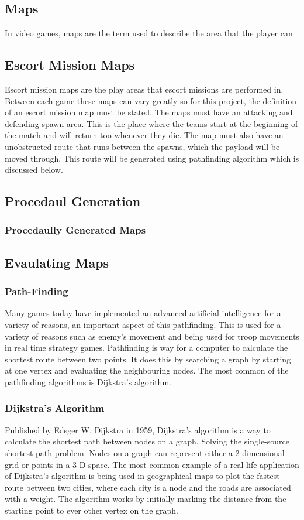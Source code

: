 \documentclass{article}
\begin{document}
\subsection{Maps}
In video games, maps are the term used to describe the area that the player can 
\subsection{Escort Mission Maps}
Escort mission maps are the play areas that escort missions are performed in. Between each game these maps can vary greatly so for this project, the definition of an escort mission map must be stated. The maps must have an attacking and defending spawn area. This is the place where the teams start at the beginning of the match and will return too whenever they die. The map must also have an unobstructed route that runs between the spawns, which the payload will be moved through. This route will be generated using pathfinding algorithm which is discussed below. 
\subsection{Procedaul Generation}
\subsubsection{Procedaully Generated Maps}
\subsection{Evaulating Maps}
\subsubsection{Path-Finding}
Many games today have implemented an advanced artificial intelligence for a variety of reasons, an important aspect of this pathfinding. This is used for a variety of reasons such as enemy’s movement and being used for troop movements in real time strategy games. Pathfinding is way for a computer to calculate the shortest route between two points. It does this by searching a graph by starting at one vertex and evaluating the neighbouring nodes. The most common of the pathfinding algorithms is Dijkstra's algorithm.	
\subsubsection{Dijkstra’s Algorithm}
 Published by Edsger W. Dijkstra in 1959, Dijkstra’s algorithm is a way to calculate the shortest path between nodes on a graph. Solving the single-source shortest path problem. Nodes on a graph can represent either a 2-dimensional grid or points in a 3-D space. The most common example of a real life application of Dijkstra’s algorithm is being used in geographical maps to plot the fastest route between two cities, where each city is a node and the roads are associated with a weight. 
 \newline
 The algorithm works by initially marking the distance from the starting point to ever other vertex on the graph. 
\end{document}
